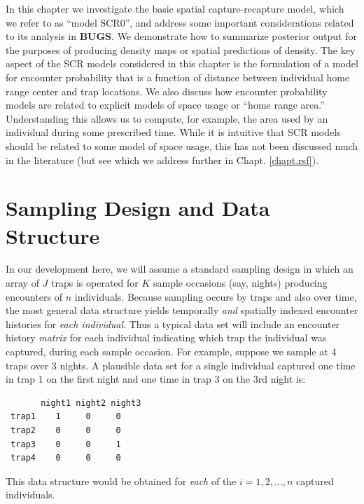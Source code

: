 In this chapter we investigate the basic
spatial capture-recapture model, which we refer to as ``model SCR0'',
and address some important considerations related to its analysis in
{\bf BUGS}.  We demonstrate how to summarize posterior output for the
purposes of producing density maps or spatial predictions of density.
The key aspect of the SCR models considered in this chapter is the
formulation of a model for encounter probability that is a function of
distance between individual home range center and trap locations.  We
also discuss how encounter probability models are related to explicit
models of space usage or ``home range area.'' Understanding this
allows us to compute, for example, the area used by an individual
during some
prescribed time.  While it is intuitive that SCR models
should be related to some model of space usage, this has not been
discussed much in the literature (but see \citet{royle_etal:2012mee}
which we address further in Chapt. \ref{chapt.rsf}).


\section{Sampling Design and Data Structure}

In our development here, we will assume a standard sampling design in
which an array of $J$ traps is operated for $K$ sample occasions (say,
nights) producing encounters of $n$ individuals.  Because sampling
occurs by traps and also over time, the most general data structure
yields 
temporally {\it and} spatially indexed
encounter histories for {\it each individual}.
 Thus a typical data set will
include an encounter history {\it matrix} for each individual
indicating which trap the individual was captured, during each sample
occasion.  For example, suppose we sample 
at 4 traps over 3 nights. A plausible data set for a
single individual captured one time in trap 1 on the first night and
one time in trap 3 on the 3rd night is:
\begin{verbatim}
       night1 night2 night3
 trap1    1     0     0
 trap2    0     0     0
 trap3    0     0     1
 trap4    0     0     0
\end{verbatim}
This data structure would be obtained for {\it each} of the
$i=1,2,\ldots,n$ captured individuals.

